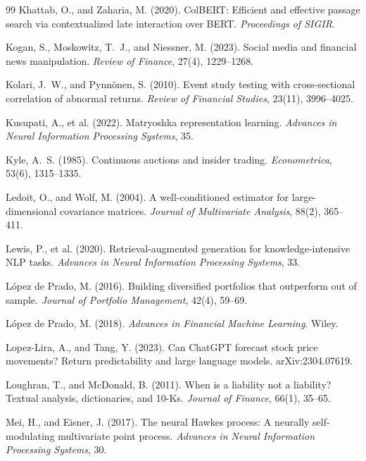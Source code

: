 \documentclass[11pt,a4paper]{article}
\theoremstyle{plain}
\theoremstyle{definition}
\theoremstyle{remark}
\begin{document}
\begin{thebibliography}{99}
Khattab, O., and Zaharia, M. (2020). ColBERT: Efficient and effective passage search via contextualized late interaction over BERT. \emph{Proceedings of SIGIR}.

Kogan, S., Moskowitz, T.~J., and Niessner, M. (2023). Social media and financial news manipulation. \emph{Review of Finance}, 27(4), 1229--1268.

Kolari, J.~W., and Pynn\"onen, S. (2010). Event study testing with cross-sectional correlation of abnormal returns. \emph{Review of Financial Studies}, 23(11), 3996--4025.

Kusupati, A., et al. (2022). Matryoshka representation learning. \emph{Advances in Neural Information Processing Systems}, 35.

Kyle, A.~S. (1985). Continuous auctions and insider trading. \emph{Econometrica}, 53(6), 1315--1335.

Ledoit, O., and Wolf, M. (2004). A well-conditioned estimator for large-dimensional covariance matrices. \emph{Journal of Multivariate Analysis}, 88(2), 365--411.

Lewis, P., et al. (2020). Retrieval-augmented generation for knowledge-intensive NLP tasks. \emph{Advances in Neural Information Processing Systems}, 33.

L\'opez de Prado, M. (2016). Building diversified portfolios that outperform out of sample. \emph{Journal of Portfolio Management}, 42(4), 59--69.

L\'opez de Prado, M. (2018). \emph{Advances in Financial Machine Learning}. Wiley.

Lopez-Lira, A., and Tang, Y. (2023). Can ChatGPT forecast stock price movements? Return predictability and large language models. arXiv:2304.07619.

Loughran, T., and McDonald, B. (2011). When is a liability not a liability? Textual analysis, dictionaries, and 10-Ks. \emph{Journal of Finance}, 66(1), 35--65.

Mei, H., and Eisner, J. (2017). The neural Hawkes process: A neurally self-modulating multivariate point process. \emph{Advances in Neural Information Processing Systems}, 30.


\end{thebibliography}
\end{document}

